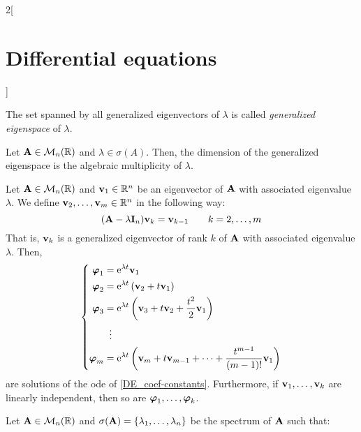 \documentclass[../../../main.tex]{subfiles}
\begin{document}
\begin{multicols}{2}[\section{Differential equations}]
\begin{definition}
    The set spanned by all generalized eigenvectors of $\lambda$ is called \textit{generalized eigenspace} of $\lambda$.
  \end{definition}
  \begin{prop}
    Let $\boldsymbol{\mathrm{A}}\in\mathcal{M}_n(\mathbb{R})$ and $\lambda\in\sigma(A)$. Then, the dimension of the generalized eigenspace is the algebraic multiplicity of $\lambda$.
  \end{prop}
  \begin{lemma}
    Let $\boldsymbol{\mathrm{A}}\in\mathcal{M}_n(\mathbb{R})$ and $\boldsymbol{\mathrm{v}}_1\in\mathbb{R}^n$ be an eigenvector of $\boldsymbol{\mathrm{A}}$ with associated eigenvalue $\lambda$. We define $\boldsymbol{\mathrm{v}}_2,\ldots,\boldsymbol{\mathrm{v}}_m\in\mathbb{R}^n$ in the following way: $$(\boldsymbol{\mathrm{A}}-\lambda\boldsymbol{\mathrm{I}}_n)\boldsymbol{\mathrm{v}}_k=\boldsymbol{\mathrm{v}}_{k-1}\qquad k=2,\ldots, m$$
    That is, $\boldsymbol{\mathrm{v}}_k$ is a generalized eigenvector of rank $k$ of $\boldsymbol{\mathrm{A}}$ with associated eigenvalue $\lambda$. Then,
    $$
      \left\{
      \begin{aligned}
        \boldsymbol{\mathrm{\varphi}}_1 & =\mathrm{e}^{\lambda t}\boldsymbol{\mathrm{v}}_1                                                                                          \\
        \boldsymbol{\mathrm{\varphi}}_2 & =\mathrm{e}^{\lambda t}\left(\boldsymbol{\mathrm{v}}_2+t\boldsymbol{\mathrm{v}}_1\right)                                                       \\
        \boldsymbol{\mathrm{\varphi}}_3 & =\mathrm{e}^{\lambda t}\left(\boldsymbol{\mathrm{v}}_3+t\boldsymbol{\mathrm{v}}_2+\frac{t^2}{2}\boldsymbol{\mathrm{v}}_1\right)                     \\
                                   & \;\;\vdots                                                                                                                    \\
        \boldsymbol{\mathrm{\varphi}}_m & =\mathrm{e}^{\lambda t}\left(\boldsymbol{\mathrm{v}}_m+t\boldsymbol{\mathrm{v}}_{m-1}+\cdots+\frac{t^{m-1}}{(m-1)!}\boldsymbol{\mathrm{v}}_1\right) \\
      \end{aligned}
      \right.
    $$
    are solutions of the ode of \cref{DE_coef-constants}. Furthermore, if $\boldsymbol{\mathrm{v}}_1,\ldots,\boldsymbol{\mathrm{v}}_k$ are linearly independent, then so are $\boldsymbol{\mathrm{\varphi}}_1,\ldots,\boldsymbol{\mathrm{\varphi}}_k$.
  \end{lemma}
  \begin{corollary}
    Let $\boldsymbol{\mathrm{A}}\in\mathcal{M}_n(\mathbb{R})$ and $\sigma(\boldsymbol{\mathrm{A}})=\{\lambda_1,\ldots,\lambda_n\}$ be the spectrum of $\boldsymbol{\mathrm{A}}$ such that:

\end{corollary}
\end{multicols}
\end{document}
